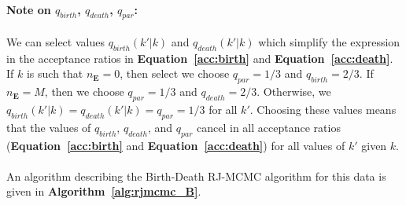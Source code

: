 \paragraph{Note on $q_{birth}$, $q_{death}$, $q_{par}$:} We can select values $q_{birth}(k' | k)$ and $q_{death}(k' | k)$ which simplify the expression in the acceptance ratios in \textbf{Equation~\ref{acc:birth}} and \textbf{Equation~\ref{acc:death}}. If $k$ is such that $n_{\mathbf{E}} = 0$, then select we choose $q_{par} = 1/3$ and $q_{birth} = 2/3$. If  $n_{\mathbf{E}} = M$, then we choose $q_{par} = 1/3$ and $q_{death} = 2/3$. Otherwise, we  $q_{birth}(k' | k) = q_{death}(k' | k) = q_{par} = 1/3$ for all $k'$. Choosing these values means that the values of $q_{birth}$, $q_{death}$, and $q_{par}$ cancel in all acceptance ratios (\textbf{Equation~\ref{acc:birth}} and \textbf{Equation~\ref{acc:death}}) for all values of $k'$ given $k$.

\paragraph{} An algorithm describing the Birth-Death RJ-MCMC algorithm for this data is given in \textbf{Algorithm~\ref{alg:rjmcmc_B}}.

